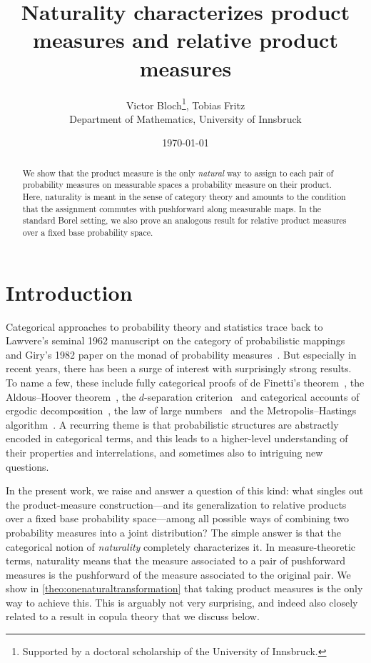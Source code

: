 \documentclass[11pt,a4paper]{scrartcl}
\title{Naturality characterizes product measures and relative product measures}
\author{Victor Bloch\thanks{Supported by a doctoral scholarship of the University of Innsbruck.}, Tobias Fritz\\[0.5em]
\small Department of Mathematics, University of Innsbruck}
\date{\today}
\theoremstyle{definition}
\begin{document}
\maketitle

\begin{abstract}
	We show that the product measure is the only \emph{natural} way to assign to each pair of probability measures on measurable spaces a probability measure on their product.
	Here, naturality is meant in the sense of category theory and amounts to the condition that the assignment commutes with pushforward along measurable maps.
	In the standard Borel setting, we also prove an analogous result for relative product measures over a fixed base probability space.
\end{abstract}

\tableofcontents

\section{Introduction}

Categorical approaches to probability theory and statistics trace back to Lawvere's seminal 1962 manuscript on the category of probabilistic mappings~\cite{Lawvere1962} and Giry's 1982 paper on the monad of probability measures~\cite{Giry1982}.
But especially in recent years, there has been a surge of interest with surprisingly strong results.
To name a few, these include fully categorical proofs of de Finetti's theorem~\cite{Fritz2018}, the Aldous--Hoover theorem~\cite{Chen2025}, the $d$-separation criterion~\cite{FritzKlingler2023}
and categorical accounts of ergodic decomposition~\cite{Moss2023}, the law of large numbers~\cite{Fritz2026} and the Metropolis--Hastings algorithm~\cite{Cornish2026}.
A recurring theme is that probabilistic structures are abstractly encoded in categorical terms, and this leads to a higher-level understanding of their properties and interrelations,
and sometimes also to intriguing new questions.

In the present work, we raise and answer a question of this kind: what singles out the product-measure construction---and its generalization to relative products over a fixed base probability space---among all possible ways of combining two probability measures into a joint distribution?
The simple answer is that the categorical notion of \emph{naturality} completely characterizes it.
In measure-theoretic terms, naturality means that the measure associated to a pair of pushforward measures is the pushforward of the measure associated to the original pair.
We show in \cref{theo:onenaturaltransformation} that taking product measures is the only way to achieve this.
This is arguably not very surprising, and indeed also closely related to a result in copula theory that we discuss below.
\end{document}
